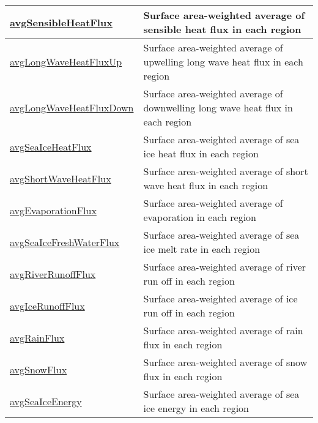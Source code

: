 {\begin{center}
\begin{longtable}{| p{2.0in} | p{4.0in} |}
    \hline
    \hyperref[subsec:var_sec_surfaceAreaWeightedAveragesAM_avgSensibleHeatFlux]{avgSensibleHeatFlux} & Surface area-weighted average of sensible heat flux in each region \\
    \hline
    \hyperref[subsec:var_sec_surfaceAreaWeightedAveragesAM_avgLongWaveHeatFluxUp]{avgLongWaveHeatFluxUp} & Surface area-weighted average of upwelling long wave heat flux in each region \\
    \hline
    \hyperref[subsec:var_sec_surfaceAreaWeightedAveragesAM_avgLongWaveHeatFluxDown]{avgLongWaveHeatFluxDown} & Surface area-weighted average of downwelling long wave heat flux in each region \\
    \hline
    \hyperref[subsec:var_sec_surfaceAreaWeightedAveragesAM_avgSeaIceHeatFlux]{avgSeaIceHeatFlux} & Surface area-weighted average of sea ice heat flux in each region \\
    \hline
    \hyperref[subsec:var_sec_surfaceAreaWeightedAveragesAM_avgShortWaveHeatFlux]{avgShortWaveHeatFlux} & Surface area-weighted average of short wave heat flux in each region \\
    \hline
    \hyperref[subsec:var_sec_surfaceAreaWeightedAveragesAM_avgEvaporationFlux]{avgEvaporationFlux} & Surface area-weighted average of evaporation in each region \\
    \hline
    \hyperref[subsec:var_sec_surfaceAreaWeightedAveragesAM_avgSeaIceFreshWaterFlux]{avgSeaIceFreshWaterFlux} & Surface area-weighted average of sea ice melt rate in each region \\
    \hline
    \hyperref[subsec:var_sec_surfaceAreaWeightedAveragesAM_avgRiverRunoffFlux]{avgRiverRunoffFlux} & Surface area-weighted average of river run off in each region \\
    \hline
    \hyperref[subsec:var_sec_surfaceAreaWeightedAveragesAM_avgIceRunoffFlux]{avgIceRunoffFlux} & Surface area-weighted average of ice run off in each region \\
    \hline
    \hyperref[subsec:var_sec_surfaceAreaWeightedAveragesAM_avgRainFlux]{avgRainFlux} & Surface area-weighted average of rain flux in each region \\
    \hline
    \hyperref[subsec:var_sec_surfaceAreaWeightedAveragesAM_avgSnowFlux]{avgSnowFlux} & Surface area-weighted average of snow flux in each region \\
    \hline
    \hyperref[subsec:var_sec_surfaceAreaWeightedAveragesAM_avgSeaIceEnergy]{avgSeaIceEnergy} & Surface area-weighted average of sea ice energy in each region \\

\end{longtable}
\end{center}}
